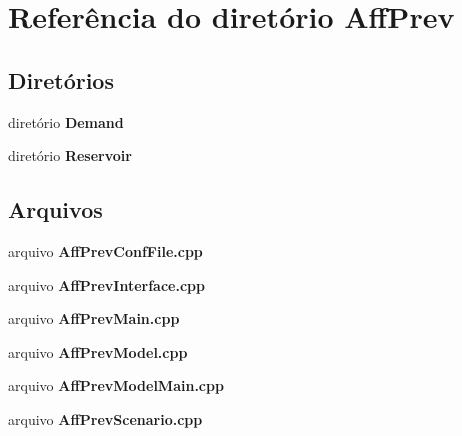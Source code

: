 \section{Referência do diretório Aff\+Prev}
\label{dir_324e475b21d670312190b278d7e62ef4}
\subsection*{Diretórios}
\begin{DoxyCompactItemize}
\item 
diretório {\bf Demand}
\item 
diretório {\bf Reservoir}
\end{DoxyCompactItemize}
\subsection*{Arquivos}
\begin{DoxyCompactItemize}
\item 
arquivo {\bf Aff\+Prev\+Conf\+File.\+cpp}
\item 
arquivo {\bf Aff\+Prev\+Interface.\+cpp}
\item 
arquivo {\bf Aff\+Prev\+Main.\+cpp}
\item 
arquivo {\bf Aff\+Prev\+Model.\+cpp}
\item 
arquivo {\bf Aff\+Prev\+Model\+Main.\+cpp}
\item 
arquivo {\bf Aff\+Prev\+Scenario.\+cpp}
\end{DoxyCompactItemize}
